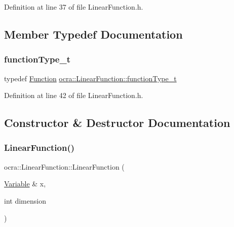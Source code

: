 Definition at line 37 of file Linear\+Function.\+h.



\subsection{Member Typedef Documentation}
\hypertarget{classocra_1_1LinearFunction_adaf7f13c522f2001ced48c64a361c2e6}{}\label{classocra_1_1LinearFunction_adaf7f13c522f2001ced48c64a361c2e6} 
\subsubsection{\texorpdfstring{function\+Type\+\_\+t}{functionType\_t}}
{\footnotesize\ttfamily typedef \hyperlink{classocra_1_1Function}{Function} \hyperlink{classocra_1_1LinearFunction_adaf7f13c522f2001ced48c64a361c2e6}{ocra\+::\+Linear\+Function\+::function\+Type\+\_\+t}}



Definition at line 42 of file Linear\+Function.\+h.



\subsection{Constructor \& Destructor Documentation}
\hypertarget{classocra_1_1LinearFunction_af44da8931811a95725d1d25c697aa5d2}{}\label{classocra_1_1LinearFunction_af44da8931811a95725d1d25c697aa5d2} 
\subsubsection{\texorpdfstring{Linear\+Function()}{LinearFunction()}\hspace{0.1cm}{\footnotesize\ttfamily [1/2]}}
{\footnotesize\ttfamily ocra\+::\+Linear\+Function\+::\+Linear\+Function (\begin{DoxyParamCaption}\item[{\hyperlink{classocra_1_1Variable}{Variable} \&}]{x,  }\item[{int}]{dimension }\end{DoxyParamCaption})\hspace{0.3cm}{\ttfamily [protected]}}

